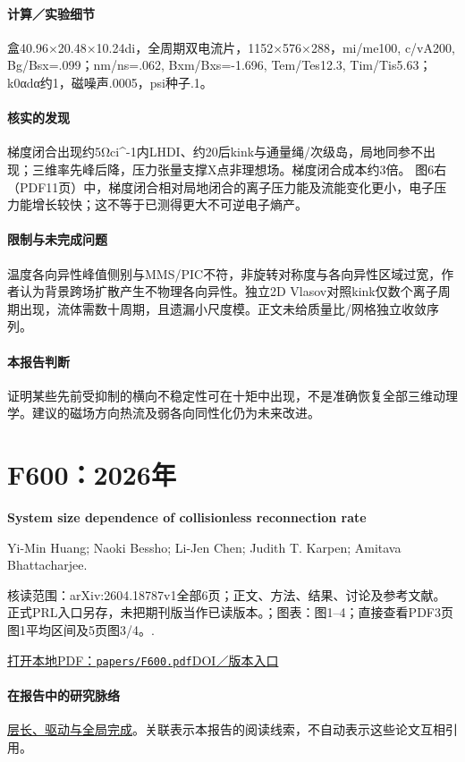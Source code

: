 \paragraph{计算／实验细节}盒40.96×20.48×10.24di，全周期双电流片，1152×576×288，mi/me100, c/vA200, Bg/Bsx=.099；nm/ns=.062, Bxm/Bxs=-1.696, Tem/Tes12.3, Tim/Tis5.63；k0αdα约1，磁噪声.0005，psi种子.1。

\paragraph{核实的发现}梯度闭合出现约5Ωci\textasciicircum{}-1内LHDI、约20后kink与通量绳/次级岛，局地同参不出现；三维率先峰后降，压力张量支撑X点非理想场。梯度闭合成本约3倍。 图6右（PDF11页）中，梯度闭合相对局地闭合的离子压力能及流能变化更小，电子压力能增长较快；这不等于已测得更大不可逆电子熵产。

\paragraph{限制与未完成问题}温度各向异性峰值侧别与MMS/PIC不符，非旋转对称度与各向异性区域过宽，作者认为背景跨场扩散产生不物理各向异性。独立2D Vlasov对照kink仅数个离子周期出现，流体需数十周期，且遗漏小尺度模。正文未给质量比/网格独立收敛序列。

\paragraph{本报告判断}证明某些先前受抑制的横向不稳定性可在十矩中出现，不是准确恢复全部三维动理学。建议的磁场方向热流及弱各向同性化仍为未来改进。

\section{F600：2026年}\label{paper:F600}

\textbf{System size dependence of collisionless reconnection rate}\citep{F600}\

Yi-Min Huang;  Naoki Bessho;  Li-Jen Chen;  Judith T. Karpen;  Amitava Bhattacharjee.

\textsf{核读范围：}arXiv:2604.18787v1全部6页；正文、方法、结果、讨论及参考文献。正式PRL入口另存，未把期刊版当作已读版本。；\textsf{图表：}图1–4；直接查看PDF3页图1平均区间及5页图3/4。.

\href{run:papers/F600.pdf}{打开本地PDF：\texttt{papers/F600.pdf}}\quad\href{https://doi.org/10.1103/xpsr-4hqn}{DOI／版本入口}

\paragraph{在报告中的研究脉络}\hyperref[story:global]{层长、驱动与全局完成}。关联表示本报告的阅读线索，不自动表示这些论文互相引用。

